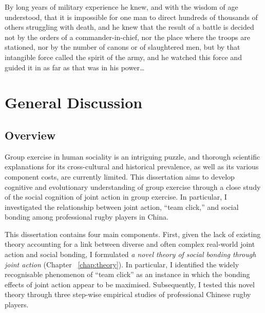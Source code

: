 
\begin{savequote}[8cm]
By long years of military experience he knew, and with the wisdom of age understood, that it is impossible for one man to direct hundreds of thousands of others struggling with death, and he knew that the result of a battle is decided not by the orders of a commander-in-chief, nor the place where the troops are stationed, nor by the number of canons or of slaughtered men, but by that intangible force called the spirit of the army, and he watched this force and guided it in as far as that was in his power\dots
\end{savequote}

\chapter{\label{chap:generalDiscussion}General Discussion}





\section{Overview}


Group exercise in human sociality is an intriguing puzzle, and thorough scientific explanations for its cross-cultural and historical prevalence, as well as its various component costs, are currently limited.  This dissertation aims to develop cognitive and evolutionary understanding of group exercise through a close study of the social cognition of joint action in group exercise.  In particular, I investigated the relationship between joint action, ``team click,'' and social bonding among professional rugby players in China.

This dissertation contains four main components.  First, given the lack of existing theory accounting for a link between diverse and often complex real-world joint action and social bonding, I formulated \textit{a novel theory of social bonding through joint action} (Chapter ~\ref{chap:theory}).  In particular, I identified the widely recognisable phenomenon of ``team click'' as an instance in which the bonding effects of joint action appear to be maximised.  Subsequently, I tested this novel theory through three step-wise empirical studies of professional Chinese rugby players.

